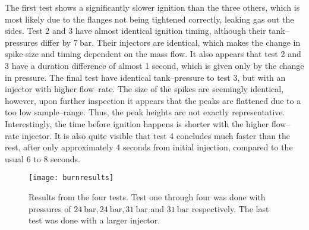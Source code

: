 	The first test shows a significantly slower ignition than the three others, which is most likely due to the flanges not being tightened correctly, leaking gas out the sides. Test 2 and 3 have almost identical ignition timing, although their tank--pressures differ by $\SI{7}{\bar}$. Their injectors are identical, which makes the change in spike size and timing dependent on the mass flow. It also appears that test 2 and 3 have a duration difference of almost 1 second, which is given only by the change in pressure. 
	The final test have identical tank--pressure to test 3, but with an injector with higher flow--rate. The size of the spikes are seemingly identical, however, upon further inspection it appears that the peaks are flattened due to a too low sample--range. Thus, the peak heights are not exactly representative. Interestingly, the time before ignition happens is shorter with the higher flow--rate injector. It is also quite visible that test 4 concludes much faster than the rest, after only approximately 4 seconds from initial injection, compared to the usual 6 to 8 seconds.

	\begin{figure}
		\centering
		\texttt{[image: burnresults]}
		\caption{Results from the four tests. Test one through four was done with pressures of $\SI{24}{\bar}, \SI{24}{\bar}, \SI{31}{\bar}$ and $\SI{31}{\bar}$ respectively. The last test was done with a larger injector.}
	\label{fig:burnresults}
	\end{figure}


%

%

